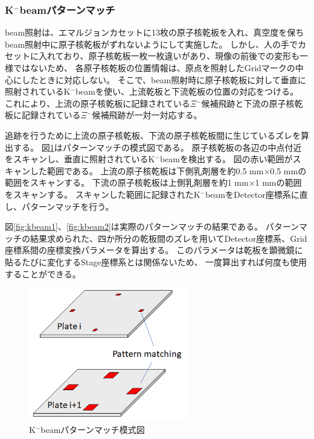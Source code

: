 \documentclass[12pt,a4paper]{jarticle}
\begin{document}
\subsubsection{K$^-$beamパターンマッチ}
beam照射は、エマルジョンカセットに13枚の原子核乾板を入れ、真空度を保ちbeam照射中に原子核乾板がずれないようにして実施した。
しかし、人の手でカセットに入れており、原子核乾板一枚一枚違いがあり、現像の前後での変形も一様ではないため、
各原子核乾板の位置情報は、原点を照射したGridマークの中心にしたときに対応しない。
そこで、beam照射時に原子核乾板に対して垂直に照射されているK$^-$beamを使い、上流乾板と下流乾板の位置の対応をつける。
これにより、上流の原子核乾板に記録されている$\Xi$$^-$候補飛跡と下流の原子核乾板に記録されている$\Xi$$^-$候補飛跡が一対一対応する。
\par
追跡を行うために上流の原子核乾板、下流の原子核乾板間に生じているズレを算出する。
図\ref{fig:beam_mosikizu}はパターンマッチの模式図である。
原子核乾板の各辺の中点付近をスキャンし、垂直に照射されているK$^-$beamを検出する。
図の赤い範囲がスキャンした範囲である。
上流の原子核乾板は下側乳剤層を約0.5 mm×0.5 mmの範囲をスキャンする。
下流の原子核乾板は上側乳剤層を約1 mm×1 mmの範囲をスキャンする。
スキャンした範囲に記録されたK$^-$beamをDetector座標系に直し、パターンマッチを行う。
\par
図\ref{fig:kbeam1}、\ref{fig:kbeam2}は実際のパターンマッチの結果である。
パターンマッチの結果求められた、四か所分の乾板間のズレを用いてDetector座標系、Grid座標系間の座標変換パラメータを算出する。
このパラメータは乾板を顕微鏡に貼るたびに変化するStage座標系とは関係ないため、
一度算出すれば何度も使用することができる。
\begin{figure}[htbp]
  \centering
     \includegraphics[width=70mm]{kbeam_pattern.png}
  \caption{K$^-$beamパターンマッチ模式図\label{fig:beam_mosikizu}}
\end{figure}
\end{document}
